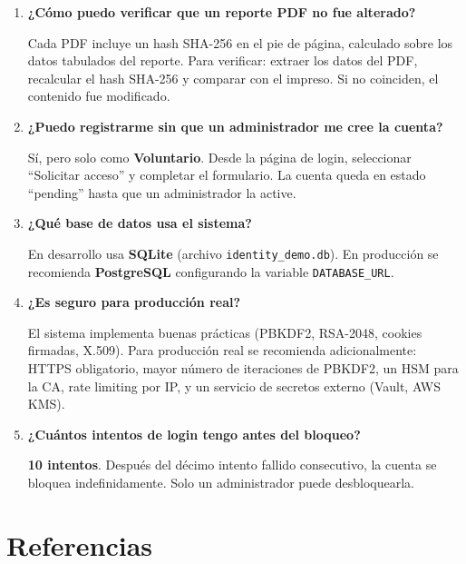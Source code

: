 \documentclass[10pt,letterpaper]{report}
\begin{document}
\begin{enumerate}[leftmargin=1cm, label=\textbf{P\arabic*.}]
  \item \textbf{¿Cómo puedo verificar que un reporte PDF no fue alterado?}

  Cada PDF incluye un hash SHA-256 en el pie de página, calculado sobre los datos tabulados del reporte. Para verificar: extraer los datos del PDF, recalcular el hash SHA-256 y comparar con el impreso. Si no coinciden, el contenido fue modificado.

  \item \textbf{¿Puedo registrarme sin que un administrador me cree la cuenta?}

  Sí, pero solo como \textbf{Voluntario}. Desde la página de login, seleccionar ``Solicitar acceso'' y completar el formulario. La cuenta queda en estado ``pending'' hasta que un administrador la active.

  \item \textbf{¿Qué base de datos usa el sistema?}

  En desarrollo usa \textbf{SQLite} (archivo \texttt{identity\_demo.db}). En producción se recomienda \textbf{PostgreSQL} configurando la variable \texttt{DATABASE\_URL}.

  \item \textbf{¿Es seguro para producción real?}

  El sistema implementa buenas prácticas (PBKDF2, RSA-2048, cookies firmadas, X.509). Para producción real se recomienda adicionalmente: HTTPS obligatorio, mayor número de iteraciones de PBKDF2, un HSM para la CA, rate limiting por IP, y un servicio de secretos externo (Vault, AWS KMS).

  \item \textbf{¿Cuántos intentos de login tengo antes del bloqueo?}

  \textbf{10 intentos}. Después del décimo intento fallido consecutivo, la cuenta se bloquea indefinidamente. Solo un administrador puede desbloquearla.

\end{enumerate}

\chapter{Referencias}
\end{document}
